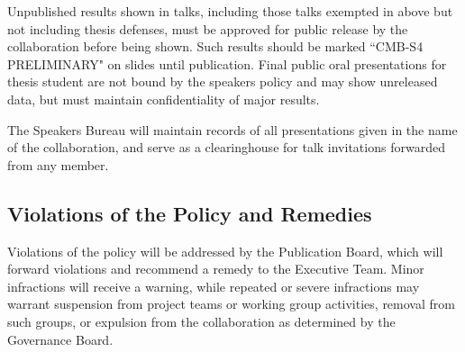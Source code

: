 Unpublished results shown in talks, including those talks exempted in above but not including thesis defenses, must be approved for public release by the collaboration before being shown. Such results should be marked ``CMB-S4 PRELIMINARY" on slides until publication.  Final public oral presentations for thesis student are not bound by the speakers policy and may show unreleased data, but must maintain confidentiality of major results.

The Speakers Bureau will maintain records of all presentations given in the name of the collaboration, and serve as a clearinghouse for talk invitations forwarded from any member.  

\subsection{Violations of the Policy and Remedies}
Violations of the policy will be addressed by the Publication Board, which will forward violations and recommend a remedy to the Executive Team.  Minor infractions will receive a warning, while repeated or severe infractions may warrant suspension from project teams or working group activities, removal from such groups, or expulsion from the collaboration as determined by the Governance Board.













